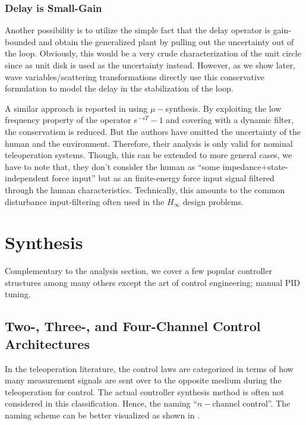\subsubsection{Delay is Small-Gain}
Another possibility is to utilize the simple fact that the delay operator is gain-bounded and obtain the 
generalized plant by pulling out the uncertainty out of the loop. Obviously, this would be a very crude
characterization of the unit circle since as unit disk is used as the uncertainty instead. However, as 
we show later, wave variables/scattering transformations directly use this conservative formulation to 
model the delay in the stabilization of the loop.

A similar approach is reported in \cite{leungfa} using $\mu-$synthesis. By exploiting the
low frequency property of the operator $e^{-sT}-1$ and covering with a dynamic filter, the conservatism
is reduced. But the authors have omitted the uncertainty of the human and the environment. Therefore, 
their analysis is only valid for nominal teleoperation systems. Though, this can be extended to more 
general cases, we have to note that, they don't consider the human as ``some impedance$+$state-independent 
force input'' but as an finite-energy force input signal filtered through the human characteristics. 
Technically, this amounts to the common disturbance input-filtering often used in the $H_\infty$ design problems. 

 




\section{Synthesis}

Complementary to the analysis section, we cover a few popular controller structures among many others except the 
art of control engineering; manual PID tuning. 

\subsection{Two-, Three-, and Four-Channel Control Architectures}
In the teleoperation literature, the control laws are categorized in terms of how many measurement signals 
are sent over to the opposite medium during the teleoperation for control. The actual controller synthesis 
method is often not considered in this classification.  Hence, the naming ``$n-$channel control''. The naming 
scheme can be better visualized as shown in . 


